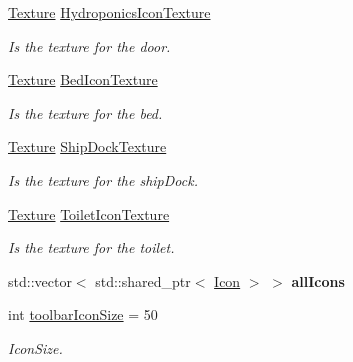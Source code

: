 \begin{DoxyCompactItemize}
\mbox{\label{class_tool_bar_a60544cb328690f8e55537dc45b830b2e}} 
\hyperlink{class_texture}{Texture} \hyperlink{class_tool_bar_a60544cb328690f8e55537dc45b830b2e}{Hydroponics\+Icon\+Texture}
\begin{DoxyCompactList}\small\item\em Is the texture for the door. \end{DoxyCompactList}\item 
\mbox{\label{class_tool_bar_a4143f05fb2705734554828ca8cf8ceab}} 
\hyperlink{class_texture}{Texture} \hyperlink{class_tool_bar_a4143f05fb2705734554828ca8cf8ceab}{Bed\+Icon\+Texture}
\begin{DoxyCompactList}\small\item\em Is the texture for the bed. \end{DoxyCompactList}\item 
\mbox{\label{class_tool_bar_ac92c7b8005c4c16e36b4cb7e0f230415}} 
\hyperlink{class_texture}{Texture} \hyperlink{class_tool_bar_ac92c7b8005c4c16e36b4cb7e0f230415}{Ship\+Dock\+Texture}
\begin{DoxyCompactList}\small\item\em Is the texture for the ship\+Dock. \end{DoxyCompactList}\item 
\mbox{\label{class_tool_bar_aa5575f342de731d775cdc8f4b1c35747}} 
\hyperlink{class_texture}{Texture} \hyperlink{class_tool_bar_aa5575f342de731d775cdc8f4b1c35747}{Toilet\+Icon\+Texture}
\begin{DoxyCompactList}\small\item\em Is the texture for the toilet. \end{DoxyCompactList}\item 
\mbox{\label{class_tool_bar_ae480899c40038817888f7b470160aded}} 
std\+::vector$<$ std\+::shared\+\_\+ptr$<$ \hyperlink{class_icon}{Icon} $>$ $>$ {\bfseries all\+Icons}
\item 
\mbox{\label{class_tool_bar_a14472b3c0e6e18c5c10ee8ac2ae8b5f7}} 
int \hyperlink{class_tool_bar_a14472b3c0e6e18c5c10ee8ac2ae8b5f7}{toolbar\+Icon\+Size} = 50
\begin{DoxyCompactList}\small\item\em Icon\+Size. \end{DoxyCompactList}\item 

\end{DoxyCompactItemize}
